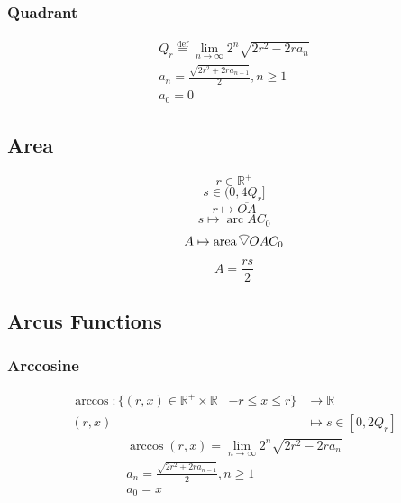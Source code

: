 \documentclass[a4paper,12pt]{report}
\DeclareMathOperator{\arc}{arc}
\DeclareMathOperator{\area}{area}
\newcommand{\circularsector}{
    \begin{tikzpicture}[baseline=-0.1ex, scale=0.27]
        \draw (0,0) -- (60:1) arc (60:120:1) -- cycle;
    \end{tikzpicture}
}
\begin{document}
\subsubsection{Quadrant}
\begin{subequations}
\begin{gather}
Q_r \stackrel{\text{def}}{=} \lim \limits_{n \to \infty} 2^n \sqrt{2r^2 - 2ra_n} \\
a_n = \frac{\sqrt{2r^2 + 2ra_{n-1}}}{2}, n \geq 1 \\
a_0 = 0
\end{gather}
\end{subequations}
\subsection{Area}
\begin{equation}
r \in \mathbb{R}^+
\end{equation}
\begin{equation}
s \in (0, 4Q_r]
\end{equation}
\begin{equation}
r \mapsto \overline{OA}
\end{equation}
\begin{equation}
s \mapsto \arc AC_0
\end{equation}
\begin{equation}
A \mapsto \area \circularsector OAC_0
\end{equation}
\begin{equation}
A = \frac{rs}{2}
\end{equation}
\subsection{Arcus Functions}
\subsubsection{Arccosine}
\begin{equation}
\begin{aligned}
\arccos \colon \{(r,x) \in \mathbb{R}^{+} \times \mathbb{R} \mid -r \leq x \leq r\} & \to \mathbb{R} \\
(r,x) & \mapsto s \in \left[0, 2Q_r\right]
\end{aligned}
\end{equation}
\begin{subequations}
\begin{gather}
\arccos(r,x) = \lim \limits_{n \to \infty} 2^n \sqrt{2r^2 - 2ra_n} \\
a_n = \frac{\sqrt{2r^2 + 2ra_{n-1}}}{2}, n \geq 1 \\
a_0 = x
\end{gather}
\end{subequations}
\end{document}
